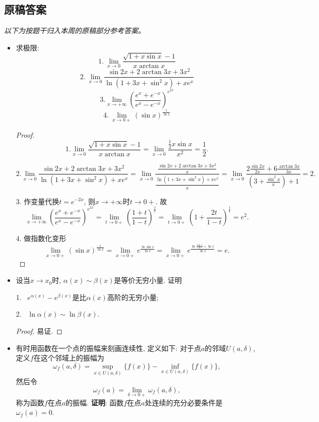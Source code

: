 \documentclass[UTF8,11pt, a4paper, oneside, fontset=none]{ctexbook}
\begin{document}
\clearpage

\subsection*{原稿答案}

\noindent\emph{以下为按题干归入本周的原稿部分参考答案。}

\begin{itemize}
\item[(1)] 求极限: 
\[
1. \ \lim_{x \to 0} \frac{\sqrt{1 + x \sin x} -1}{x \arctan x}
\]
\[
2. \ \lim_{x \to 0} \frac{\sin 2x + 2 \arctan 3x + 3x^2}{\ln(1 + 3x + \sin^2 x) + xe^x} 
\]
\[
3. \lim_{x \to +\infty} \left( \frac{e^x + e^{-x}}{e^x - e^{-x}}\right)^{e^{2x}} 
\]
\[
4. \ \lim_{x \to 0+}(\sin x)^{\frac{1}{\ln x}}
\]


\begin{proof}


\[
1. \lim_{x \to 0} \frac{\sqrt{1 + x \sin x} -1}{x \arctan x} = \lim_{x \to 0}\frac{\frac{1}{2}x\sin x}{x^2} = \frac{1}{2}.
\]

\[
2.  \lim_{x \to 0} \frac{\sin 2x + 2 \arctan 3x + 3x^2}{\ln(1 + 3x + \sin^2 x) + xe^x} = \lim_{x \to 0} \frac{\frac{\sin 2x + 2 \arctan 3x + 3x^2}{x} }{\frac{\ln(1 + 3x + \sin^2 x) + xe^x}{x}} = \lim_{x \to 0} \frac{2\frac{\sin 2x}{2x} + 6 \frac{\arctan 3x}{3x}}{(3 + \frac{\sin^2 x}{x})+1} =2.
\]


3. 作变量代换$t = e^{-2x}$, 则$x \to +\infty$时$t \to 0+$. 故
\[
 \lim_{x \to +\infty} \left( \frac{e^x + e^{-x}}{e^x - e^{-x}}\right)^{e^{2x}} = \lim_{t \to 0+}\left( \frac{1+t}{1-t}\right)^{\frac{1}{t}} = \lim_{t \to 0+}\left( 1 + \frac{2t}{1-t}\right)^{\frac{1}{t}} = e^2.
\]

4. 做指数化变形
\[
\lim_{x \to 0+}(\sin x)^{\frac{1}{\ln x}} = \lim_{x \to 0+} e^{\frac{\ln \sin x}{\ln x}} =  \lim_{x \to 0+} e^{\frac{\ln \frac{\sin x}{x} +\ln x}{\ln x}} =e.
\]

\end{proof}

\item[(2)] 设当$x \to x_0$时, $\alpha(x) \sim \beta(x)$是等价无穷小量. 证明

1. \ $e^{\alpha(x)} - e^{\beta(x)}$是比$\alpha(x)$高阶的无穷小量;

2. \ $\ln \alpha(x) \sim \ln \beta(x) $.

\begin{proof}
易证.
\end{proof}

\item[(3)] 有时用函数在一个点的振幅来刻画连续性, 定义如下: 对于点$a$的邻域$U(a, \delta)$, 定义$f$在这个邻域上的振幅为
\[
\omega_f(a, \delta) = \sup_{x \in U(a, \delta)}\{ f(x)\} - \inf_{x \in U(a, \delta)}\{ f(x)\},
\]
然后令
\[
\omega_f(a) = \lim_{\delta \to 0+} \omega_f(a, \delta),
\]
称为函数$f$在点$a$的振幅. {\bf 证明}: 函数$f$在点$a$处连续的充分必要条件是$\omega_f(a) =0$.


\end{itemize}
\end{document}
